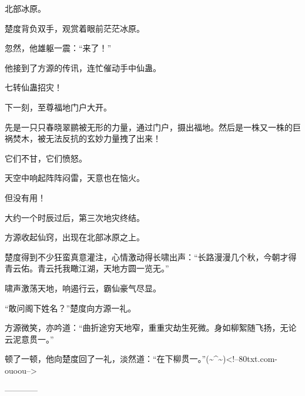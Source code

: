\begin{this_body}
北部冰原。

楚度背负双手，观赏着眼前茫茫冰原。

忽然，他雄躯一震：“来了！”

他接到了方源的传讯，连忙催动手中仙蛊。

七转仙蛊招灾！

下一刻，至尊福地门户大开。

先是一只只春晓翠鹂被无形的力量，通过门户，摄出福地。然后是一株又一株的巨祸焚木，被无法反抗的玄妙力量拽了出来！

它们不甘，它们愤怒。

天空中响起阵阵闷雷，天意也在恼火。

但没有用！

大约一个时辰过后，第三次地灾终结。

方源收起仙窍，出现在北部冰原之上。

楚度得到不少狂蛮真意灌注，心情激动得长啸出声：“长路漫漫几个秋，今朝才得青云佑。青云托我瞰江湖，天地方圆一览无。”

啸声激荡天地，响遏行云，霸仙豪气尽显。

“敢问阁下姓名？”楚度向方源一礼。

方源微笑，亦吟道：“曲折途穷天地窄，重重灾劫生死微。身如柳絮随飞扬，无论云泥意贯一。”

顿了一顿，他向楚度回了一礼，淡然道：“在下柳贯一。”(\~{}\^{}\~{})<!--80txt.com-ouoou-->

------------

\end{this_body}

